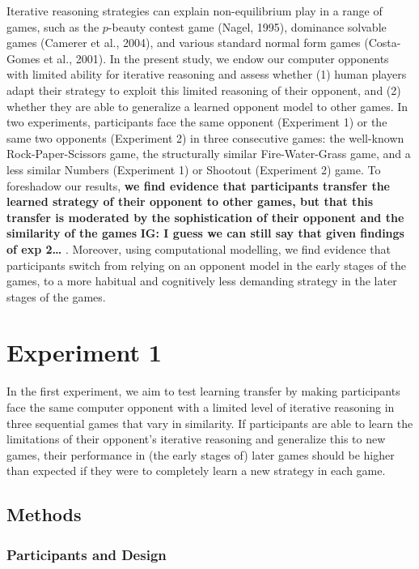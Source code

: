 \documentclass[english,man,floatsintext]{apa6}
\begin{document}
Iterative reasoning strategies can explain non-equilibrium play in a range of games, such as the \(p\)-beauty contest game (Nagel, 1995), dominance solvable games (Camerer et al., 2004), and various standard normal form games (Costa-Gomes et al., 2001). In the present study, we endow our computer opponents with limited ability for iterative reasoning and assess whether (1) human players adapt their strategy to exploit this limited reasoning of their opponent, and (2) whether they are able to generalize a learned opponent model to other games. In two experiments, participants face the same opponent (Experiment 1) or the same two opponents (Experiment 2) in three consecutive games: the well-known Rock-Paper-Scissors game, the structurally similar Fire-Water-Grass game, and a less similar Numbers (Experiment 1) or Shootout (Experiment 2) game. To foreshadow our results, \textbf{we find evidence that participants transfer the learned strategy of their opponent to other games, but that this transfer is moderated by the sophistication of their opponent and the similarity of the games} \textbf{IG: I guess we can still say that given findings of exp 2\ldots{}} . Moreover, using computational modelling, we find evidence that participants switch from relying on an opponent model in the early stages of the games, to a more habitual and cognitively less demanding strategy in the later stages of the games.

\hypertarget{experiment-1}{%
\section{Experiment 1}\label{experiment-1}}

In the first experiment, we aim to test learning transfer by making participants face the same computer opponent with a limited level of iterative reasoning in three sequential games that vary in similarity. If participants are able to learn the limitations of their opponent's iterative reasoning and generalize this to new games, their performance in (the early stages of) later games should be higher than expected if they were to completely learn a new strategy in each game.

\hypertarget{methods}{%
\subsection{Methods}\label{methods}}

\hypertarget{participants-and-design}{%
\subsubsection{Participants and Design}\label{participants-and-design}}
\end{document}

